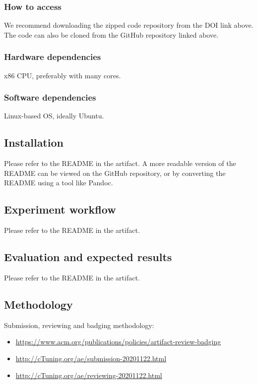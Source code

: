 \subsubsection{How to access}

We recommend downloading the zipped code repository
  from the DOI link above.
The code can also be cloned from the GitHub
  repository linked above.

\subsubsection{Hardware dependencies}

x86 CPU, preferably with many cores.

\subsubsection{Software dependencies}

Linux-based OS, ideally Ubuntu.

\subsection{Installation}

Please refer to the README in the artifact.
A more readable version of the README can be viewed
  on the GitHub repository,
  or by converting the README
  using a tool like Pandoc.

\subsection{Experiment workflow}

Please refer to the README in the artifact.

\subsection{Evaluation and expected results}

Please refer to the README in the artifact.


\subsection{Methodology}

Submission, reviewing and badging methodology:

\begin{itemize}
  \item \url{https://www.acm.org/publications/policies/artifact-review-badging}
  \item \url{http://cTuning.org/ae/submission-20201122.html}
  \item \url{http://cTuning.org/ae/reviewing-20201122.html}
\end{itemize}

